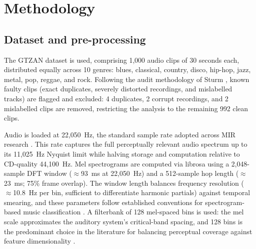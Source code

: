 \documentclass{article}
\begin{document}
\section{Methodology}\label{sec:methodology}

\subsection{Dataset and pre-processing}\label{subsec:dataset}

The GTZAN dataset \cite{Tzanetakis2002} is used, comprising 1,000 audio clips of 30 seconds each, distributed equally across 10 genres: blues, classical, country, disco, hip-hop, jazz, metal, pop, reggae, and rock. Following the audit methodology of Sturm \cite{sturm2013gtzan}, known faulty clips (exact duplicates, severely distorted recordings, and mislabelled tracks) are flagged and excluded: 4 duplicates, 2 corrupt recordings, and 2 mislabelled clips are removed, restricting the analysis to the remaining 992 clean clips.

Audio is loaded at 22,050~Hz, the standard sample rate adopted across MIR research \cite{Tzanetakis2002,McFee2015}. This rate captures the full perceptually relevant audio spectrum up to its 11,025~Hz Nyquist limit while halving storage and computation relative to CD-quality 44,100~Hz. Mel spectrograms are computed via librosa \cite{McFee2015} using a 2,048-sample DFT window ($\approx$93~ms at 22,050~Hz) and a 512-sample hop length ($\approx$23~ms; 75\% frame overlap). The window length balances frequency resolution ($\approx$10.8~Hz per bin, sufficient to differentiate harmonic partials) against temporal smearing, and these parameters follow established conventions for spectrogram-based music classification \cite{Dieleman2014,Choi2017}. A filterbank of 128 mel-spaced bins is used: the mel scale approximates the auditory system's critical-band spacing, and 128 bins is the predominant choice in the literature for balancing perceptual coverage against feature dimensionality \cite{Choi2017,McFee2015}.
\end{document}
